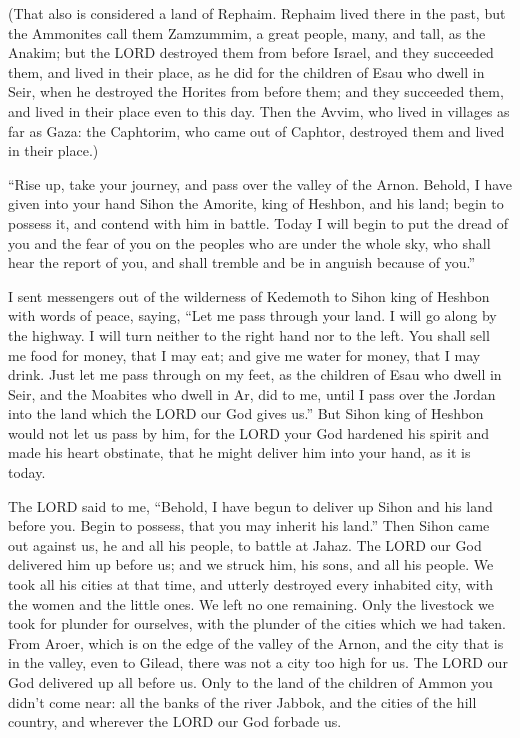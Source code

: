 \myverse{}(That also is considered a land of Rephaim. Rephaim lived there
in the past, but the Ammonites call them Zamzummim,
\myverse{}a great people, many, and tall, as the Anakim; but the LORD destroyed them
from before Israel, and they succeeded them, and lived in their place,
\myverse{}as he did for the children of Esau who dwell in Seir, when he destroyed the
Horites from before them; and they succeeded them, and lived in their place even to this day.
\myverse{}Then the Avvim, who lived in villages as far as Gaza: the Caphtorim, who came
out of Caphtor, destroyed them and lived in their place.)


\myverse{}“Rise up, take your journey, and pass over the valley of the
Arnon. Behold, I have given into your hand Sihon the Amorite, king of Heshbon, and his land; begin to
possess it, and contend with him in battle.
\myverse{}Today I will begin to put the dread of you and the fear of you on the peoples
who are under the whole sky, who shall hear the report of you, and shall tremble and be in anguish because
of you.”


\myverse{}I sent messengers out of the wilderness of Kedemoth to Sihon
king of Heshbon with words of peace, saying,
\myverse{}“Let me pass through your land. I will go along by the highway. I will turn
neither to the right hand nor to the left.
\myverse{}You shall sell me food for money, that I may eat; and give me water for money,
that I may drink. Just let me pass through on my feet,
\myverse{}as the children of Esau who dwell in Seir, and the Moabites who dwell in Ar,
did to me, until I pass over the Jordan into the land which the LORD our God gives us.”
\myverse{}But Sihon king of Heshbon would not let us pass by him, for the LORD your
God hardened his spirit and made his heart obstinate, that he might deliver him into your hand, as it
is today.


\myverse{}The LORD said to me, “Behold, I have begun to deliver up Sihon
and his land before you. Begin to possess, that you may inherit his land.”
\myverse{}Then Sihon came out against us, he and all his people, to battle at Jahaz.
\myverse{}The LORD our God delivered him up before us; and we struck him, his sons,
and all his people.
\myverse{}We took all his cities at that time, and utterly destroyed every inhabited
city, with the women and the little ones. We left no one remaining.
\myverse{}Only the livestock we took for plunder for ourselves, with the plunder of
the cities which we had taken.
\myverse{}From Aroer, which is on the edge of the valley of the Arnon, and the city
that is in the valley, even to Gilead, there was not a city too high for us. The LORD our God delivered
up all before us.
\myverse{}Only to the land of the children of Ammon you didn’t come near: all the banks
of the river Jabbok, and the cities of the hill country, and wherever the LORD our God forbade us.


